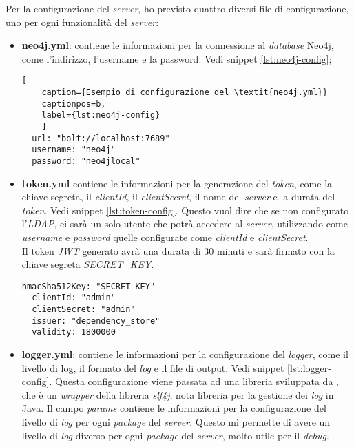 Per la configurazione del \textit{server}, ho previsto quattro diversi file di configurazione, uno per ogni funzionalità del \textit{server}:
\begin{itemize}
  \item \textbf{neo4j.yml}: contiene le informazioni per la connessione al \textit{database} Neo4j, come l'indirizzo, l'username e la password. Vedi snippet \ref*{lst:neo4j-config};
  \begin{lstlisting}[
    caption={Esempio di configurazione del \textit{neo4j.yml}}
    captionpos=b, 
    label={lst:neo4j-config}
    ]
  url: "bolt://localhost:7689"
  username: "neo4j"
  password: "neo4jlocal"
  \end{lstlisting}
  \item \textbf{token.yml} contiene le informazioni per la generazione del \textit{token}, come la chiave segreta, il \textit{clientId}, il \textit{clientSecret}, il
    nome del \textit{server} e la durata del \textit{token}. Vedi snippet \ref*{lst:token-config}.
    Questo vuol dire che se non configurato l'\textit{LDAP}, ci sarà un solo utente che potrà accedere al \textit{server}, 
    utilizzando come \textit{username} e \textit{password} quelle configurate come \textit{clientId} e \textit{clientSecret}.\\
    Il token \textit{JWT} generato avrà una durata di 30 minuti e sarà firmato con la chiave segreta \textit{SECRET\_KEY}.
    \begin{lstlisting}[caption={Esempio di configurazione del \textit{token.yml}.},captionpos=b, label={lst:token-config}]
  hmacSha512Key: "SECRET_KEY"
  clientId: "admin"
  clientSecret: "admin"
  issuer: "dependency_store"
  validity: 1800000
    \end{lstlisting}
  \item \textbf{logger.yml}: contiene le informazioni per la configurazione del \textit{logger}, come il livello di log, il formato del \textit{log} e il file di output. Vedi snippet \ref*{lst:logger-config}.
    Questa configurazione viene passata ad una libreria sviluppata da \azienda{}, che è un \textit{wrapper} della libreria \textit{slf4j}, nota libreria per la gestione dei \textit{log} in Java.
    Il campo \textit{params} contiene le informazioni per la configurazione del livello di \textit{log} per ogni \textit{package} del \textit{server}. 
    Questo mi permette di avere un livello di \textit{log} diverso per ogni \textit{package} del \textit{server}, molto utile per il \textit{debug}.
    \begin{lstlisting}[caption={Esempio di configurazione del \textit{logger.yml}.},captionpos=b, label={lst:logger-config}]

\end{lstlisting}
\end{itemize}
